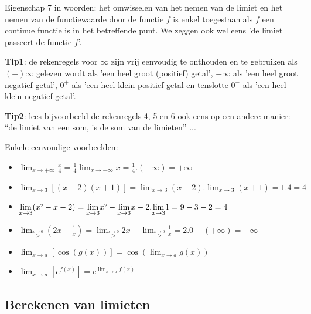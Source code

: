 \medskip{}


\noindent Eigenschap 7 in woorden: het omwisselen van het nemen van
de limiet en het nemen van de functiewaarde door de functie $f$ is
enkel toegestaan als $f$ een continue functie is in het betreffende
punt. We zeggen ook wel eens 'de limiet passeert de functie $f$'.

\medskip{}


\noindent \textbf{Tip1}: de rekenregels voor $\infty$ zijn vrij eenvoudig
te onthouden en te gebruiken als $(+)\infty$ gelezen wordt als 'een
heel groot (positief) getal', $-\infty$ als 'een heel groot negatief
getal', $0^{+}$ als 'een heel klein positief getal en tenslotte $0^{-}$
als 'een heel klein negatief getal'.

\noindent \textbf{Tip2}: lees bijvoorbeeld de rekenregels 4, 5 en 6 ook eens
op een andere manier: ``de limiet van een som, is de som van de limieten''
...

\medskip{}


\noindent Enkele eenvoudige voorbeelden:
\begin{itemize}
\item ${\displaystyle \lim_{x\to+\infty}}\frac{x}{4}=\frac{1}{4}{\displaystyle \lim_{x\to+\infty}}x=\frac{1}{4}.(+\infty)=+\infty$
\item ${\displaystyle \lim_{x\to3}}\left[(x-2)(x+1)\right]={\displaystyle \lim_{x\to3}}(x-2).{\displaystyle \lim_{x\to3}}(x+1)=1.4=4$
\item ${\displaystyle \lim_{x\to3}}(x\text{\texttwosuperior}-x-2)={\displaystyle \lim_{x\to3}}x\text{\texttwosuperior}-{\displaystyle \lim_{x\to3}}x-2.{\displaystyle \lim_{x\to3}}1=9-3-2=4$
\item ${\displaystyle \lim_{\overset{x\rightarrow0}{>}}}\left(2x-\frac{1}{x}\right)={\displaystyle \lim_{\overset{x\rightarrow0}{>}}}2x-{\displaystyle \lim_{\overset{x\rightarrow0}{>}}}\frac{1}{x}=2.0-\left(+\infty\right)=-\infty$
\item ${\displaystyle \lim_{x\to a}}\left[\cos\left(g(x)\right)\right]=\cos\left({\displaystyle \lim_{x\to a}}g(x)\right)$
\item ${\displaystyle \lim_{x\to a}}\left[e^{f(x)}\right]=e^{{\displaystyle \lim_{x\to a}}f(x)}$
\end{itemize}

\subsection{Berekenen van limieten}


